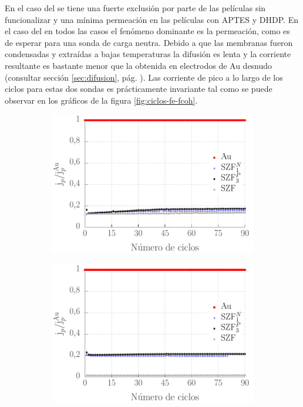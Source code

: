 		
		En el caso del \fe\space se tiene una fuerte exclusión por parte de las películas sin funcionalizar y una mínima permeación en las películas con APTES y DHDP. 
		En el caso del \fc\space en todos las casos el fenómeno dominante es la permeación, como es de esperar para una sonda de carga neutra. Debido a que las membranas fueron condensadas y extraídas a bajas temperaturas la difusión es lenta y la corriente resultante es bastante menor que la obtenida en electrodos de Au desnudo (consultar sección \ref{sec:difusion}, pág. \pageref{sec:difusion}). Las corriente de pico a lo largo de los ciclos para estas dos sondas es prácticamente invariante tal como se puede observar en los gráficos de la figura \ref{fig:ciclos-fe-fcoh}.\vspace*{-4mm}

			\begin{figure}[h!]
		 	\begin{subfigure}[t]{0.495\textwidth}
		 	  \includegraphics[width=\textwidth]{Graficos/ciclosintferroceno.pdf}
		      \end{subfigure}
			\begin{subfigure}[t]{0.495\textwidth}
		 	    \includegraphics[width=\textwidth]{Graficos/ciclosintfecn.pdf}

\end{subfigure}
\end{figure}
